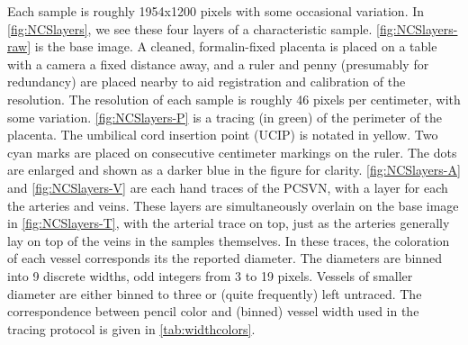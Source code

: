Each sample is roughly 1954x1200 pixels with some occasional variation.
In \cref{fig:NCSlayers}, we see these four layers of a characteristic sample.
\cref{fig:NCSlayers-raw} is the base image.
A cleaned, formalin-fixed placenta is placed on a table with a camera a fixed distance away,
and a ruler and penny (presumably for redundancy) are placed nearby to aid registration and
calibration of the resolution.
The resolution of each sample is roughly 46 pixels per centimeter, with some variation.
\cref{fig:NCSlayers-P} is a tracing (in green) of the perimeter of the placenta.
The umbilical cord insertion point (UCIP) is notated in yellow.
Two cyan marks are placed on consecutive centimeter markings on the ruler.
The dots are enlarged and shown as a darker blue in the figure for clarity.
\cref{fig:NCSlayers-A} and \cref{fig:NCSlayers-V} are each hand traces of the PCSVN,
  with a layer for each the arteries and veins.
These layers are simultaneously overlain on the base image in \cref{fig:NCSlayers-T},
with the arterial trace on top,
just as the arteries generally lay on top of the veins in the samples themselves.
In these traces, the coloration of each vessel corresponds its the reported diameter.
The diameters are binned into 9 discrete widths, odd integers from 3 to 19 pixels.
Vessels of smaller diameter are either binned to three or (quite frequently) left untraced.
The correspondence between pencil color and (binned) vessel width used in the tracing protocol
  is given in \cref{tab:widthcolors}.

